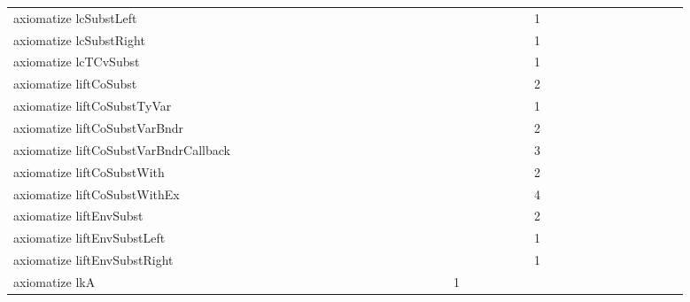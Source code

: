 {\begin{tabular}{l|rrr|rrr|rrr}
axiomatize lcSubstLeft &  &  &  &  &  &  &  &  &  &  &  &  &  &  &  &  &  &  &  &  &  &  &  & 1 &  &  &  &  &  &  &  &  &  &  &  & \\
axiomatize lcSubstRight &  &  &  &  &  &  &  &  &  &  &  &  &  &  &  &  &  &  &  &  &  &  &  & 1 &  &  &  &  &  &  &  &  &  &  &  & \\
axiomatize lcTCvSubst &  &  &  &  &  &  &  &  &  &  &  &  &  &  &  &  &  &  &  &  &  &  &  & 1 &  &  &  &  &  &  &  &  &  &  &  & \\
axiomatize liftCoSubst &  &  &  &  &  &  &  &  &  &  &  &  &  &  &  &  &  &  &  &  &  &  &  & 2 &  &  &  &  &  &  &  &  &  &  &  & \\
axiomatize liftCoSubstTyVar &  &  &  &  &  &  &  &  &  &  &  &  &  &  &  &  &  &  &  &  &  &  &  & 1 &  &  &  &  &  &  &  &  &  &  &  & \\
axiomatize liftCoSubstVarBndr &  &  &  &  &  &  &  &  &  &  &  &  &  &  &  &  &  &  &  &  &  &  &  & 2 &  &  &  &  &  &  &  &  &  &  &  & \\
axiomatize liftCoSubstVarBndrCallback &  &  &  &  &  &  &  &  &  &  &  &  &  &  &  &  &  &  &  &  &  &  &  & 3 &  &  &  &  &  &  &  &  &  &  &  & \\
axiomatize liftCoSubstWith &  &  &  &  &  &  &  &  &  &  &  &  &  &  &  &  &  &  &  &  &  &  &  & 2 &  &  &  &  &  &  &  &  &  &  &  & \\
axiomatize liftCoSubstWithEx &  &  &  &  &  &  &  &  &  &  &  &  &  &  &  &  &  &  &  &  &  &  &  & 4 &  &  &  &  &  &  &  &  &  &  &  & \\
axiomatize liftEnvSubst &  &  &  &  &  &  &  &  &  &  &  &  &  &  &  &  &  &  &  &  &  &  &  & 2 &  &  &  &  &  &  &  &  &  &  &  & \\
axiomatize liftEnvSubstLeft &  &  &  &  &  &  &  &  &  &  &  &  &  &  &  &  &  &  &  &  &  &  &  & 1 &  &  &  &  &  &  &  &  &  &  &  & \\
axiomatize liftEnvSubstRight &  &  &  &  &  &  &  &  &  &  &  &  &  &  &  &  &  &  &  &  &  &  &  & 1 &  &  &  &  &  &  &  &  &  &  &  & \\
axiomatize lkA &  &  &  &  &  &  &  &  &  &  &  &  &  &  &  &  &  & 1 &  &  &  &  &  &  &  &  &  &  &  &  &  &  &  &  &  & \\

\end{tabular}}

